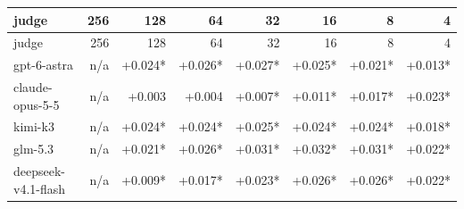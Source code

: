 \begin{longtable}{lrrrrrrr}
\toprule
judge & 256 & 128 & 64 & 32 & 16 & 8 & 4 \\
\midrule
\endfirsthead
\toprule
judge & 256 & 128 & 64 & 32 & 16 & 8 & 4 \\
\midrule
\endhead
gpt-6-astra & n/a & +0.024* & +0.026* & +0.027* & +0.025* & +0.021* & +0.013* \\
claude-opus-5-5 & n/a & +0.003 & +0.004 & +0.007* & +0.011* & +0.017* & +0.023* \\
kimi-k3 & n/a & +0.024* & +0.024* & +0.025* & +0.024* & +0.024* & +0.018* \\
glm-5.3 & n/a & +0.021* & +0.026* & +0.031* & +0.032* & +0.031* & +0.022* \\
deepseek-v4.1-flash & n/a & +0.009* & +0.017* & +0.023* & +0.026* & +0.026* & +0.022* \\
\bottomrule
\end{longtable}
